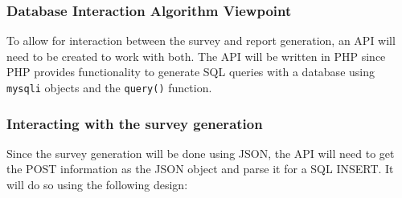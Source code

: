 \subsubsection{Database Interaction Algorithm Viewpoint}
To allow for interaction between the survey and report generation, an API will need to be created to work with both.
The API will be written in PHP since PHP provides functionality to generate SQL queries with a database using \texttt{mysqli} objects and the \texttt{query()} function.
\subsubsection{Interacting with the survey generation}
Since the survey generation will be done using JSON, the API will need to get the POST information as the JSON object and parse it for a SQL INSERT.
It will do so using the following design:

